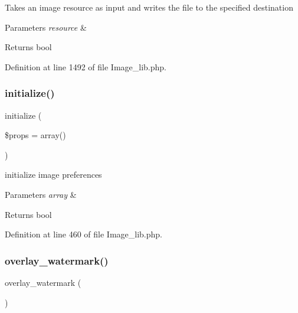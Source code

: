 Takes an image resource as input and writes the file to the specified destination


\begin{DoxyParams}{Parameters}
{\em resource} & \\
\hline
\end{DoxyParams}
\begin{DoxyReturn}{Returns}
bool 
\end{DoxyReturn}


Definition at line 1492 of file Image\+\_\+lib.\+php.

\mbox{\label{class_c_i___image__lib_a0bccf32e3d2d283de0521949330cb969}} 
\subsubsection{\texorpdfstring{initialize()}{initialize()}}
{\footnotesize\ttfamily initialize (\begin{DoxyParamCaption}\item[{}]{\$props = {\ttfamily array()} }\end{DoxyParamCaption})}

initialize image preferences


\begin{DoxyParams}{Parameters}
{\em array} & \\
\hline
\end{DoxyParams}
\begin{DoxyReturn}{Returns}
bool 
\end{DoxyReturn}


Definition at line 460 of file Image\+\_\+lib.\+php.

\mbox{\label{class_c_i___image__lib_a7fa0fd0aabe26803d61d7e09c1cb73de}} 
\subsubsection{\texorpdfstring{overlay\_watermark()}{overlay\_watermark()}}
{\footnotesize\ttfamily overlay\+\_\+watermark (\begin{DoxyParamCaption}{ }\end{DoxyParamCaption})}

